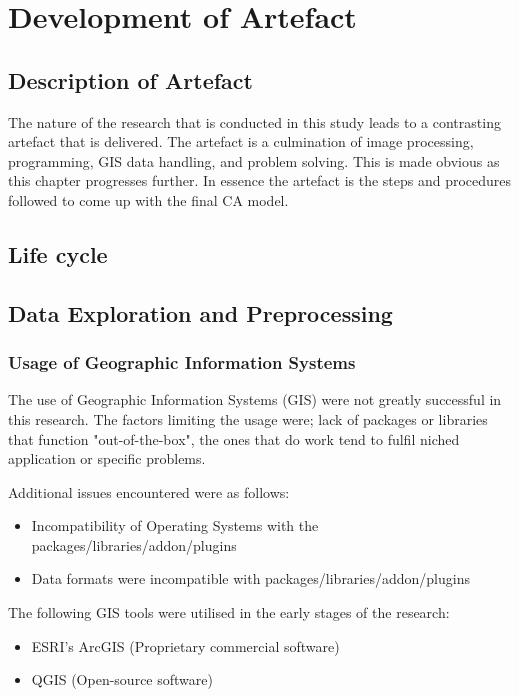 
\chapter{Development of Artefact} %
\label{Chapter3} %
\section{Description of Artefact}
The nature of the research that is conducted in this study leads to a contrasting artefact that is delivered. The artefact is a culmination of image processing, programming, GIS data handling, and problem solving. This is made obvious as this chapter progresses further. In essence the artefact is the steps and procedures followed to come up with the final CA model.
\section{Life cycle}

\section{Data Exploration and Preprocessing}
\subsection{Usage of Geographic Information Systems}
The use of Geographic Information Systems (GIS) were not greatly successful in this research. The factors limiting the usage were; lack of packages or libraries that function "out-of-the-box", the ones that do work tend to fulfil niched application or specific problems.

Additional issues encountered were as follows:
\begin{itemize}
\item Incompatibility of Operating Systems with the packages/libraries/addon/plugins
\item Data formats were incompatible with packages/libraries/addon/plugins
\end{itemize}
The following GIS tools were utilised in the early stages of the research:
\begin{itemize}
\item ESRI's ArcGIS (Proprietary commercial software)
\item QGIS (Open-source software)
\end{itemize}

